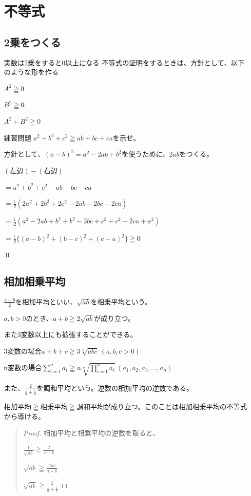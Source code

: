 \documentclass[uplatex,fleqn]{jsbook}
\begin{document}
\section{不等式}
\subsection{2乗をつくる}
実数は2乗をすると0以上になる
不等式の証明をするときは、方針として、以下のような形を作る

$A^2\geqq 0$

$B^2\geqq 0$

$A^2+B^2\geqq 0$

\begin{problem}{練習問題}
    $a^2+b^2+c^2\geqq ab+bc+ca$を示せ。
\end{problem}

\begin{answer}
    方針として、$\left(a- b\right)^2=a^2-2ab+b^2$を使うために、$2ab$をつくる。

    $\left(\text{左辺}\right)-\left(\text{右辺}\right)$

    $=a^2+b^2+c^2-ab-bc-ca$

    $\displaystyle =\frac{1}{2}\left(2a^2+2b^2+2c^2-2ab-2bc-2ca\right)$

    $\displaystyle =\frac{1}{2}\left(a^2-2ab+b^2+b^2-2bc+c^2+c^2-2ca+a^2\right)$

    $\displaystyle =\frac{1}{2}\{\left(a-b\right)^2+\left(b-c\right)^2+\left(c-a\right)^2\}\geqq 0$

    \qed
\end{answer}

\subsection{相加相乗平均}
$\displaystyle \frac{a+b}{2}$を相加平均といい、$\sqrt{ab}$を相乗平均という。

$a,b>0$のとき、$a+b\geqq2\sqrt{ab}$が成り立つ。

また3変数以上にも拡張することができる。

3変数の場合$a+b+c\geqq 3\sqrt[3]{abc}\ \left(a,b,c>0\right)$

n変数の場合$\displaystyle \sum_{i=1}^n a_i\geqq n\sqrt[n]{\prod_{i=1}^n a_i}\ \left(a_1,a_2,a_3,\dots,a_n\right)$

また、$\displaystyle \frac{2}{\frac{1}{a}+\frac{1}{b}}$を調和平均という。逆数の相加平均の逆数である。

相加平均$\geqq$相乗平均$\geqq$調和平均が成り立つ。このことは相加相乗平均の不等式から導ける。
\begin{quote}
    \begin{proof}
        相加平均と相乗平均の逆数を取ると、

        $\displaystyle \frac{1}{\sqrt{ab}}\geqq\frac{2}{a+b}$

        $\displaystyle \sqrt{ab}\geqq\frac{2ab}{a+b}$

        $\displaystyle \sqrt{ab}\geqq\frac{2}{\frac{1}{a}+\frac{1}{b}}$
    \end{proof}
\end{quote}
\end{document}
